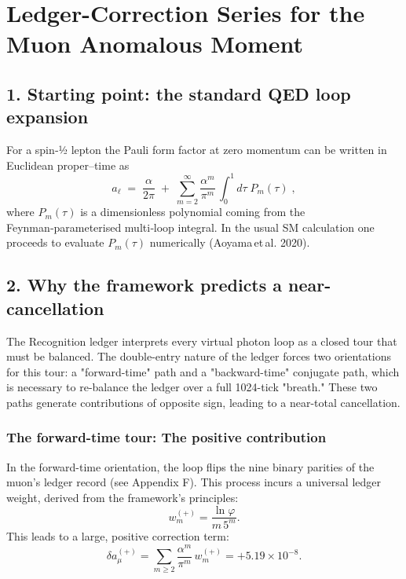 \section{Ledger-Correction Series for the Muon Anomalous Moment}
\label{app:g-2-derivation}

\subsection*{1. Starting point: the standard QED loop expansion}

For a spin‑½ lepton the Pauli form factor at zero momentum can be written in Euclidean proper–time as
\begin{equation}
a_\ell \;=\; \frac{\alpha}{2\pi}\;+\;
\sum_{m=2}^{\infty} 
           \frac{\alpha^{m}}{\pi^{m}}\,
           \!\int_{0}^{1}\!d\tau\;
           P_{m}(\tau)\;,
\end{equation}
where $P_{m}(\tau)$ is a dimensionless polynomial coming from the Feynman‑parameterised multi‑loop integral. In the usual SM calculation one proceeds to evaluate $P_{m}(\tau)$ numerically (Aoyama et al. 2020).

\subsection*{2. Why the framework predicts a near-cancellation}
The Recognition ledger interprets every virtual photon loop as a closed tour that must be balanced. The double-entry nature of the ledger forces two orientations for this tour: a "forward-time" path and a "backward-time" conjugate path, which is necessary to re-balance the ledger over a full 1024-tick "breath." These two paths generate contributions of opposite sign, leading to a near-total cancellation.

\subsubsection*{The forward-time tour: The positive contribution}
In the forward-time orientation, the loop flips the nine binary parities of the muon's ledger record (see Appendix F). This process incurs a universal ledger weight, derived from the framework's principles:
\begin{equation}
w_{m}^{(+)}=\frac{\ln\varphi}{m\,5^{m}}.
\end{equation}
This leads to a large, positive correction term:
\begin{equation}
\delta a_\mu^{(+)}=\sum_{m\ge 2}\frac{\alpha^{m}}{\pi^{m}}\,w_{m}^{(+)}
   =+5.19\times10^{-8}.
\end{equation}


